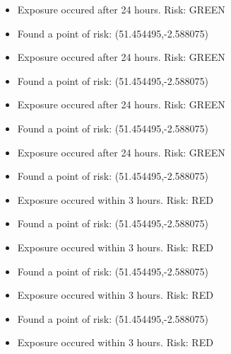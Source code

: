 \documentclass{article}
\begin{document}
\begin{itemize}
\begin{itemize}
			\item	{Exposure occured after 24 hours. Risk: GREEN}
			\item	{Found a point of risk: (51.454495,-2.588075)}
			\item	{Exposure occured after 24 hours. Risk: GREEN}
			\item	{Found a point of risk: (51.454495,-2.588075)}
			\item	{Exposure occured after 24 hours. Risk: GREEN}
			\item	{Found a point of risk: (51.454495,-2.588075)}
			\item	{Exposure occured after 24 hours. Risk: GREEN}
			\item	{Found a point of risk: (51.454495,-2.588075)}
			\item	{Exposure occured within 3 hours. Risk: RED}
			\item	{Found a point of risk: (51.454495,-2.588075)}
			\item	{Exposure occured within 3 hours. Risk: RED}
			\item	{Found a point of risk: (51.454495,-2.588075)}
			\item	{Exposure occured within 3 hours. Risk: RED}
			\item	{Found a point of risk: (51.454495,-2.588075)}
			\item	{Exposure occured within 3 hours. Risk: RED}
		\end{itemize}
\end{itemize}
\end{document}
